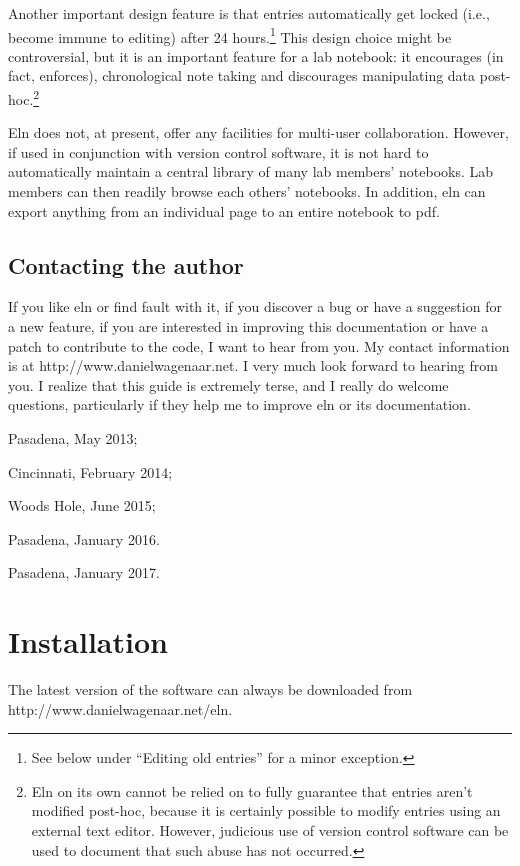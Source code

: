 \documentclass[11pt]{report}
\begin{document}
Another important design feature is that entries automatically get
locked (i.e., become immune to editing) after 24 hours.\footnote{See
  below under ``Editing old entries'' for a minor exception.} This
design choice might be controversial, but it is an important feature
for a lab notebook: it encourages (in fact, enforces), chronological
note taking and discourages manipulating data post-hoc.\footnote{Eln
  on its own cannot be relied on to fully guarantee that entries
  aren't modified post-hoc, because it is certainly possible to modify
  entries using an external text editor. However, judicious use of
  version control software can be used to document that such abuse has
  not occurred.}

Eln does not, at present, offer any facilities for multi-user
collaboration. However, if used in conjunction with version control
software, it is not hard to automatically maintain a central library of
many lab members' notebooks. Lab members can then readily browse each
others' notebooks. In addition, eln can export anything from an
individual page to an entire notebook to pdf.

\section{Contacting the author}

If you like eln or find fault with it, if you discover a bug or have a
suggestion for a new feature, if you are interested in improving this
documentation or have a patch to contribute to the code, I want to
hear from you. My contact information is at
http://www.danielwagenaar.net. I very much look forward to hearing
from you. I realize that this guide is extremely terse, and I
really do welcome questions, particularly if they help me to improve
eln or its documentation.\bigskip

\noindent Pasadena, May 2013;

\noindent Cincinnati, February 2014;

\noindent Woods Hole, June 2015;

\noindent Pasadena, January 2016.

\noindent Pasadena, January 2017.




\chapter{Installation}

The latest version of the software can always be downloaded from\break
http://www.danielwagenaar.net/eln.
\end{document}
